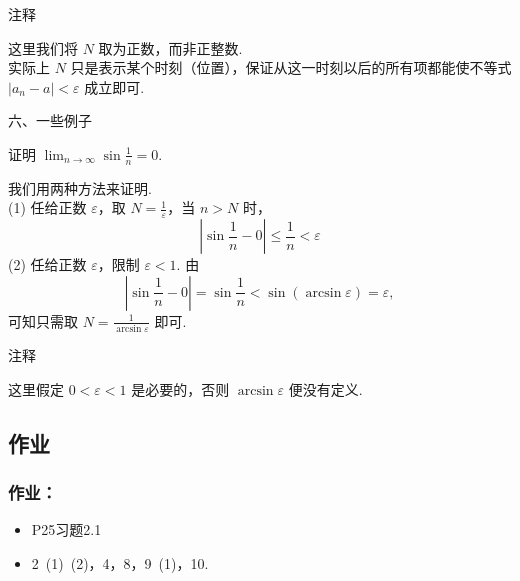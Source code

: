 \documentclass[mathserif]{beamer}
\begin{document}
\begin{frame}{注释}%
	\begin{alertblock}{}
	\suojin {}  这里我们将 $N$ 取为正数，而非正整数. \\
	\suojin 实际上 $N$ 只是表示某个时刻（位置），保证从这一时刻以后的所有项都能使不等式 $\left|a_n-a\right|<\varepsilon$ 成立即可. 
	\end{alertblock}
\end{frame}



\begin{frame}{六、一些例子}%
	\begin{ex}
		\suojin 证明 $\lim _{n \rightarrow \infty} \sin \frac{1}{n}=0$. 
	\end{ex} 
\pause 
	\begin{proofs}
		\suojin 我们用两种方法来证明.\\
	(1) 任给正数 $\varepsilon$，取 $N=\frac{1}{\varepsilon}$，当 $n>N$ 时，
	$$
	\left|\sin \frac{1}{n}-0\right| \leq \frac{1}{n}<\varepsilon
	$$
	(2) 任给正数 $\varepsilon$，限制 $\varepsilon<1$. 由
	$$
	\left|\sin \frac{1}{n}-0\right|=\sin \frac{1}{n}<\sin (\arcsin \varepsilon)=\varepsilon,
	$$
	可知只需取 $N=\frac{1}{\arcsin \varepsilon}$ 即可.
    \end{proofs} 
	
\end{frame}



\begin{frame}{注释}%
	\begin{alertblock}{}
		\suojin {}  这里假定 $0<\varepsilon<1$ 是必要的，否则 $\arcsin \varepsilon$ 便没有定义.
	\end{alertblock}
\end{frame}




%



\subsection*{作业}

\begin{frame}
	\frametitle{作业：}
	\begin{itemize}
		\item P25\quad 习题2.1
		\item[]
		\begin{center}2\ (1)\ (2)，4，8，9\ (1)，10.\end{center}
	\end{itemize}
\end{frame}
\end{document}
